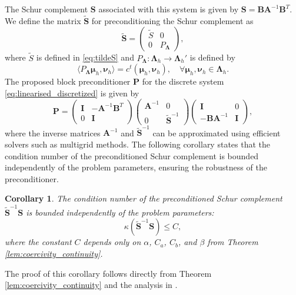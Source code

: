 \documentclass{article}
\newtheorem{corollary}[theorem]{Corollary}
\begin{document}
The Schur complement $\mathbf{S}$ associated with this system is given by $\mathbf{S} = \mathbf{B}\mathbf{A}^{-1}\mathbf{B}^T$.
We define the matrix $\tilde{\mathbf{S}}$ for preconditioning the Schur complement as
\begin{equation}
    \tilde{\mathbf{S}} = \begin{pmatrix}
        \tilde{S} & 0 \\
        0 & P_{\boldsymbol{\Lambda}}
    \end{pmatrix},
\end{equation}
where $\tilde{S}$ is defined in \eqref{eq:tildeS} and $P_{\boldsymbol{\Lambda}}: \boldsymbol{\Lambda}_h \to \boldsymbol{\Lambda}_h'$ is defined by
\begin{equation}
    \langle P_{\boldsymbol{\Lambda}} \boldsymbol{\mu}_h, \boldsymbol{\nu}_h \rangle = c^t(\boldsymbol{\mu}_h, \boldsymbol{\nu}_h), \quad \forall \boldsymbol{\mu}_h, \boldsymbol{\nu}_h \in \boldsymbol{\Lambda}_h.
\end{equation}
The proposed block preconditioner $\mathbf{P}$ for the discrete system \eqref{eq:linearised_discretized} is given by
\begin{equation}\label{eq:preconditioner}
    \mathbf{P} = 
    \begin{pmatrix}
        \mathbf{I} & -\mathbf{A}^{-1}\mathbf{B}^T \\
        0 & \mathbf{I}
    \end{pmatrix}
    \begin{pmatrix}
        \mathbf{A}^{-1} & 0 \\
        0 & \tilde{\mathbf{S}}^{-1}
    \end{pmatrix}
    \begin{pmatrix}
        \mathbf{I} & 0 \\
        -\mathbf{B}\mathbf{A}^{-1} & \mathbf{I}
    \end{pmatrix},
\end{equation}
where the inverse matrices $\mathbf{A}^{-1}$ and $\tilde{\mathbf{S}}^{-1}$ can be approximated using efficient solvers such as multigrid methods. The following corollary states that the condition number of the preconditioned Schur complement is bounded independently of the problem parameters, ensuring the robustness of the preconditioner.

\begin{corollary}
    The condition number of the preconditioned Schur complement $\tilde{\mathbf{S}}^{-1}\mathbf{S}$ is bounded independently of the problem parameters:
    \begin{equation}
        \kappa(\tilde{\mathbf{S}}^{-1}\mathbf{S}) \leq C,
    \end{equation}
    where the constant $C$ depends only on $\alpha$, $C_a$, $C_b$, and $\beta$ from Theorem \ref{lem:coercivity_continuity}.
\end{corollary}
The proof of this corollary follows directly from Theorem \ref{lem:coercivity_continuity} and the analysis in \cite{loghin2004analysis}.
\end{document}
